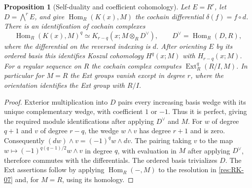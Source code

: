 \documentclass[11pt,oneside,openany]{book}
\newtheorem{proposition}[theorem]{Proposition}
\theoremstyle{definition}
\theoremstyle{remark}
\begin{document}
\begin{proposition}[Self-duality and coefficient cohomology]
\label{res:RK-10}
Let $E=R^r$, let $D=\bigwedge^r E$, and give
$\operatorname{Hom}_R(K(x),M)$ the cochain differential
$\delta(f)=f\circ d$. There is an identification of cochain
complexes
\[
 \operatorname{Hom}_R(K(x),M)^q
 \simeq K_{r-q}(x;M\otimes_R D^\vee),\qquad
 D^\vee=\operatorname{Hom}_R(D,R),
\]
where the differential on the reversed indexing is $d$.
After orienting $E$ by its ordered basis this identifies Koszul
cohomology $H^q(x;M)$ with $H_{r-q}(x;M)$. For a regular
sequence on $R$ the cochain complex computes
$\operatorname{Ext}_R^q(R/I,M)$. In particular for $M=R$ the
Ext groups vanish except in degree $r$, where the orientation
identifies the Ext group with $R/I$.
\end{proposition}
\begin{proof}
Exterior multiplication into $D$ pairs every increasing basis
wedge with its unique complementary wedge, with coefficient $1$
or $-1$. Thus it is perfect, giving the required module identifications
after applying $D^\vee$ and $M$. For $w$ of degree $q+1$ and
$v$ of degree $r-q$, the wedge $w\wedge v$ has degree $r+1$
and is zero. Consequently
$(dw)\wedge v=(-1)^q w\wedge dv$. The pairing taking $v$ to
the map $w\mapsto (-1)^{q(q-1)/2}w\wedge v$ in degree $q$,
with evaluation in $M$ after applying $D^\vee$, therefore
commutes with the differentials. The ordered basis trivializes
$D$. The Ext assertions follow by applying $\operatorname{Hom}_R(-,M)$
to the resolution in \ref{res:RK-07} and, for $M=R$, using its
homology.
\end{proof}
\end{document}
